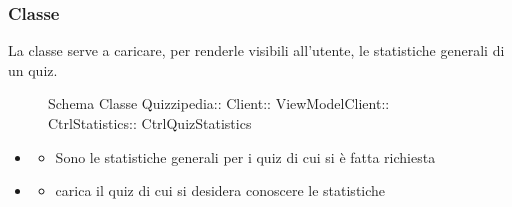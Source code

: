 \subsubsection{Classe }
La classe serve a caricare, per renderle visibili all'utente, le statistiche generali di un quiz.
\begin{figure}[H]
\centering
\noindent{}
\caption[Schema Classe CtrlQuizStatistics]{Schema Classe Quizzipedia:: Client:: ViewModelClient:: CtrlStatistics:: CtrlQuizStatistics}
\end{figure}
\begin{itemize}
\item {}
\begin{itemize}
\item {}
\newline
Sono le statistiche generali per i quiz di cui si è fatta richiesta
\end{itemize}
\item {}
\begin{itemize}
\item {}
\newline
carica il quiz di cui si desidera conoscere le statistiche
\newline
\end{itemize}
\end{itemize}
